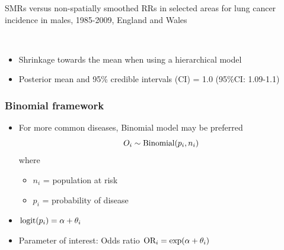 \documentclass[12pt]{beamer}
\begin{document}
\begin{frame}
SMRs versus non-spatially smoothed RRs in selected areas for lung cancer incidence in males, 1985-2009, England and Wales
\begin{center}
        \\
\end{center}

\vspace{-0.1cm}
\begin{itemize} \setlength\itemsep{\fill}
\item Shrinkage towards the mean when using a hierarchical model
\item Posterior mean and 95\% credible intervals (CI) = 1.0 (95\%CI: 1.09-1.1) %
\end{itemize}
\end{frame}


\begin{frame}
\frametitle{Binomial framework}
  \begin{itemize} \setlength\itemsep{\fill}
\item For more common diseases, Binomial model may be preferred
	$$O_i \sim \hbox{Binomial}(p_i ,n_i)$$
where
  \begin{itemize} \setlength\itemsep{\fill}
	\item $n_i$ = population at risk
	\item $p_i$ = probability of disease
  \end{itemize}
\item $\hbox{logit}(p_i) = \alpha + \theta_i$
\item Parameter of interest: Odds ratio $\hbox{OR}_i = \exp(\alpha + \theta_i)$
\end{itemize}
\end{frame}
\end{document}
